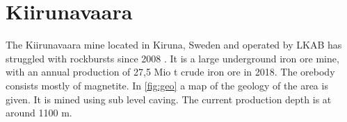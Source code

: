 \chapter{Kiirunavaara}

The Kiirunavaara mine located in Kiruna, Sweden and operated by LKAB has struggled with rockbursts since 2008 \autocite[5]{Krekula17}. It is a large underground iron ore mine, with an annual production of 27,5 Mio t crude iron ore in 2018. \autocite[28]{LKABfinance} 
The orebody consists mostly of magnetite.
In \autoref{fig:geo} a map of the geology of the area is given.
It is mined using sub level caving. The current production depth is at around 1100 m.%



